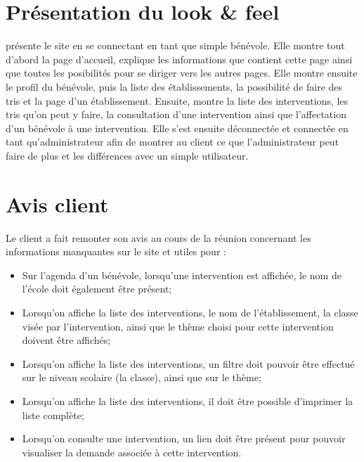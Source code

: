 \documentclass [a4paper] {article}
\begin{document}
\section{Présentation du look \& feel}
\Julie{} présente le site en se connectant en tant que simple bénévole. Elle montre tout d'abord la page d'accueil, explique les informations que contient cette page ainsi que toutes les posibilités pour se diriger vers les autres pages. Elle montre ensuite le profil du bénévole, puis la liste des établissements, la possibilité de faire des tris et la page d'un établissement. Ensuite, \Julie{} montre la liste des interventions, les tris qu'on peut y faire, la consultation d'une intervention ainsi que l'affectation d'un bénévole à une intervention. Elle s'est ensuite déconnectée et connectée en tant qu'administrateur afin de montrer au client ce que l'administrateur peut faire de plus et les différences avec un simple utilisateur. 

\section{Avis client}
Le client a fait remonter son avis au cours de la réunion concernant les informations manquantes sur le site et utiles pour \nomClient: 
\begin{itemize}
\item Sur l'agenda d'un bénévole, lorsqu'une intervention est affichée, le nom de l'école doit également être présent;
\item Lorsqu'on affiche la liste des interventions, le nom de l'établissement, la classe visée par l'intervention, ainsi que le thème choisi pour cette intervention doivent être affichés;
\item Lorsqu'on affiche la liste des interventions, un filtre doit pouvoir être effectué sur le niveau scolaire (la classe), ainsi que sur le thème;
\item Lorsqu'on affiche la liste des interventions, il doit être possible d'imprimer la liste complète;
\item Lorsqu'on consulte une intervention, un lien doit être présent pour pouvoir visualiser la demande associée à cette intervention. 
\end{itemize}



\newpage
\end{document}
